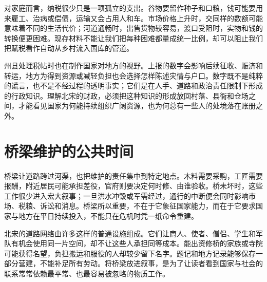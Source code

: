 对家庭而言，纳税很少只是一项孤立的支出。谷物要留作种子和口粮，钱可能要用来雇工、治病或偿债，运输又会占用人和车。市场价格上升时，交同样的数额可能意味着不同的生活代价；河道通畅时，出售货物较容易，渡口受阻时，实物和钱的转换便更困难。现存材料不能让我们把每种困难都量成统一比例，却可以阻止我们把赋税看作自动从乡村流入国库的管道。

州县处理税帖时也在制作国家对地方的视野。上报的数字会影响后续征收、赈济和转运，地方为得到资源或减轻负担也会选择怎样陈述灾情与户口。数字既不是纯粹的谎言，也不是不经过程的透明事实；它们是在人手、道路和政治责任限制下形成的行政知识。理解北宋的财政，必须把这种知识的形成放回村落、县衙和仓场之间，才能看见国家为何能持续组织广阔资源，也为何总有一些人的处境落在账册之外。

\section{桥梁维护的公共时间}

桥梁让道路跨过河渠，也把维护的责任集中到特定地点。木料需要采购，工匠需要报酬，附近居民可能承担差役，官府则要决定何时修、由谁验收。桥未坏时，这些工作很少进入宏大叙事；一旦洪水冲毁或军需经过，通行的中断便会同时影响市场、税粮、诉讼和消息。桥梁所以重要，不在于它象征国家能力，而在于它要求国家与地方在平日持续投入，不能只在危机时凭一纸命令重建。

北宋的道路网络由许多这样的普通设施组成。它们让商人、使者、僧侣、学生和军队有机会使用同一片空间，却不让这些人承担同等成本。能出资修桥的家族或寺院可能获得名望，负担搬运和服役的人却较少留下名字。题记和地方记录能够保存一部分营建，不能补足所有劳动。将桥梁放进叙事，是为了让读者看到国家与社会的联系常常依赖最平常、也最容易被忽略的物质工作。

